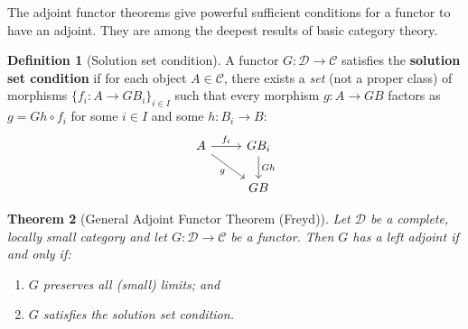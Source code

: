 \documentclass[a4paper,12pt]{book}
\theoremstyle{definition}
\newtheorem{definition}{Definition}[section]
\theoremstyle{plain}
\newtheorem{theorem}[definition]{Theorem}
\theoremstyle{remark}
\begin{document}
The adjoint functor theorems give powerful sufficient conditions
for a functor to have an adjoint.  They are among the deepest
results of basic category theory.

\begin{definition}[Solution set condition]\label{def:solution-set}
A functor $G\colon\mathcal{D}\to\mathcal{C}$ satisfies the
\textbf{solution set condition} if for each object $A\in\mathcal{C}$,
there exists a \emph{set} (not a proper class) of morphisms
$\{f_i\colon A\to GB_i\}_{i\in I}$ such that every morphism
$g\colon A\to GB$ factors as $g = Gh\circ f_i$ for some $i\in I$
and some $h\colon B_i\to B$:
\[
\begin{tikzcd}
A \arrow[r, "f_i"] \arrow[dr, "g"'] & GB_i \arrow[d, "Gh"] \\
& GB
\end{tikzcd}
\]
\end{definition}

\begin{theorem}[General Adjoint Functor Theorem (Freyd)]%
\label{thm:GAFT}
Let $\mathcal{D}$ be a complete, locally small category and let
$G\colon\mathcal{D}\to\mathcal{C}$ be a functor.
Then $G$ has a left adjoint if and only if:
\begin{enumerate}[label=(\roman*)]
\item $G$ preserves all (small) limits; and
\item $G$ satisfies the solution set condition.
\end{enumerate}
\end{theorem}
\end{document}
